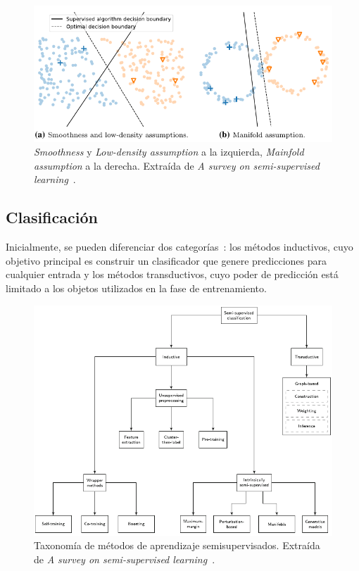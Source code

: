 \begin{figure}[h]
	\caption[Suposiciones del aprendizaje semisupervisado]{\textit{Smoothness} y \textit{Low-density assumption} a la izquierda, \textit{Mainfold assumption} a la derecha. Extraída de \textit{A survey on semi-supervised learning}~\cite{engelen2020surveyOnSemiSupervised}.}
	\label{img:assumptions}
	\centering
	\includegraphics[width=\textwidth]{../img/memoria/3_assumptions.pdf}
\end{figure}


\subsection{Clasificación}

Inicialmente, se pueden diferenciar dos categorías~\cite{engelen2020surveyOnSemiSupervised}: los métodos inductivos, cuyo objetivo principal es construir un clasificador que genere predicciones para cualquier entrada y los métodos transductivos, cuyo poder de predicción está limitado a los objetos utilizados en la fase de entrenamiento.


\begin{figure}[h]
\caption[Taxonomía de métodos de aprendizaje semisupervisado]{Taxonomía de métodos de aprendizaje semisupervisados. Extraída de \textit{A survey on semi-supervised learning}~\cite{engelen2020surveyOnSemiSupervised}.}
\centering
\includegraphics[width=\textwidth]{../img/memoria/3_hoos_taxonomy.pdf}
\end{figure}

